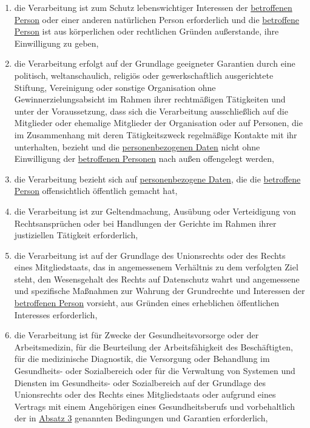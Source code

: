 \begin{enumerate}
\begin{enumerate}
    \item die Verarbeitung ist zum Schutz lebenswichtiger Interessen der \hyperref[itm:04-1]{betroffenen Person} oder einer anderen
     natürlichen Person erforderlich und die \hyperref[itm:04-1]{betroffene Person} ist aus körperlichen oder rechtlichen Gründen
     außerstande, ihre Einwilligung zu geben,
    \label{itm:09-2c}

    \item die Verarbeitung erfolgt auf der Grundlage geeigneter Garantien durch eine politisch, weltanschaulich,
     religiös oder gewerkschaftlich ausgerichtete Stiftung, Vereinigung oder sonstige Organisation ohne
     Gewinnerzielungsabsicht im Rahmen ihrer rechtmäßigen Tätigkeiten und unter der Voraussetzung, dass sich die
     Verarbeitung ausschließlich auf die Mitglieder oder ehemalige Mitglieder der Organisation oder auf Personen, die
     im Zusammenhang mit deren Tätigkeitszweck regelmäßige Kontakte mit ihr unterhalten, bezieht und die
     \hyperref[itm:04-1]{personenbezogenen Daten} nicht ohne Einwilligung der \hyperref[itm:04-1]{betroffenen Personen} nach außen offengelegt werden,
    \label{itm:09-2d}

    \item die Verarbeitung bezieht sich auf \hyperref[itm:04-1]{personenbezogene Daten}, die die \hyperref[itm:04-1]{betroffene Person} offensichtlich öffentlich
     gemacht hat,
    \label{itm:09-2e}

    \item die Verarbeitung ist zur Geltendmachung, Ausübung oder Verteidigung von Rechtsansprüchen oder bei Handlungen
     der Gerichte im Rahmen ihrer justiziellen Tätigkeit erforderlich,
    \label{itm:09-2f}

    \item die Verarbeitung ist auf der Grundlage des Unionsrechts oder des Rechts eines Mitgliedstaats, das in
     angemessenem Verhältnis zu dem verfolgten Ziel steht, den Wesensgehalt des Rechts auf Datenschutz wahrt und
     angemessene und spezifische Maßnahmen zur Wahrung der Grundrechte und Interessen der \hyperref[itm:04-1]{betroffenen Person} vorsieht,
     aus Gründen eines erheblichen öffentlichen Interesses erforderlich,
    \label{itm:09-2g}

    \item die Verarbeitung ist für Zwecke der Gesundheitsvorsorge oder der Arbeitsmedizin, für die Beurteilung der
     Arbeitsfähigkeit des Beschäftigten, für die medizinische Diagnostik, die Versorgung oder Behandlung im
     Gesundheits- oder Sozialbereich oder für die Verwaltung von Systemen und Diensten im Gesundheits- oder
     Sozialbereich auf der Grundlage des Unionsrechts oder des Rechts eines Mitgliedstaats oder aufgrund eines Vertrags
     mit einem Angehörigen eines Gesundheitsberufs und vorbehaltlich der in \hyperref[itm:09-3]{Absatz 3} genannten
     Bedingungen und Garantien erforderlich,
    \label{itm:09-2h}


\end{enumerate}
\end{enumerate}
